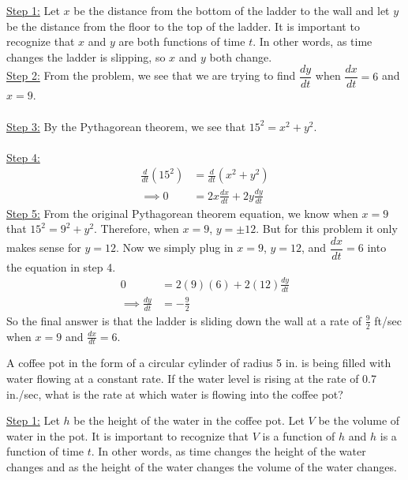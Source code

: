 \documentclass[11pt]{exam}
\begin{document}
\begin{questions}
\begin{solution}
  \underline{Step 1:} 
Let $x$ be the distance from the bottom of the ladder to the wall and let $y$ be the distance from the floor to the top of the ladder. It is important to recognize that $x$ and $y$ are both functions of time $t$. In other words, as time changes the ladder is slipping, so $x$ and $y$ both change. 
  \\
\underline{Step 2:} From the problem, we see that we are trying to find $\dfrac{dy}{dt}$ when $\dfrac{dx}{dt}=6$ and $x=9$. 
\\
\\\underline{Step 3:} By the Pythagorean theorem, we see that $15^2=x^2+y^2$. 
\\
\\\underline{Step 4:}
\begin{align*}
\frac{d}{dt}(15^2)&=\frac{d}{dt}(x^2+y^2)\\
\implies 0&= 2x\frac{dx}{dt}+2y\frac{dy}{dt}
\end{align*}
\underline{Step 5:} From the original Pythagorean theorem equation, we know when $x =9$ that $15^2 =9^2+y^2$. Therefore, when $x=9$, $y=\pm12$. But for this problem it only makes sense for $y=12$. Now we simply plug in $x=9$, $y=12$, and $\dfrac{dx}{dt}=6$ into the equation in step 4. 
\begin{align*}
0&=2(9)(6)+2(12)\frac{dy}{dt}\\
\implies \frac{dy}{dt}&=-\frac{9}{2}
\end{align*}
So the final answer is that the ladder is sliding down the wall at a rate of $\frac{9}{2}$ ft/sec when $x=9$ and $\frac{dx}{dt}=6$. 
\end{solution}
\question A coffee pot in the form of a circular cylinder of radius 5 in. is being filled with water flowing at a constant rate. If the water level is rising at the rate of 0.7 in./sec, what is the rate at which water is flowing into the coffee pot?
\begin{center}
\end{center}
\begin{solution}
\underline{Step 1:}
Let $h$ be the height of the water in the coffee pot. Let $V$ be the volume of water in the pot. It is important to recognize that $V$ is a function of $h$ and $h$ is a function of time $t$. In other words, as time changes the height of the water changes and as the height of the water changes the volume of the water changes. 


\end{solution}
\end{questions}
\end{document}

